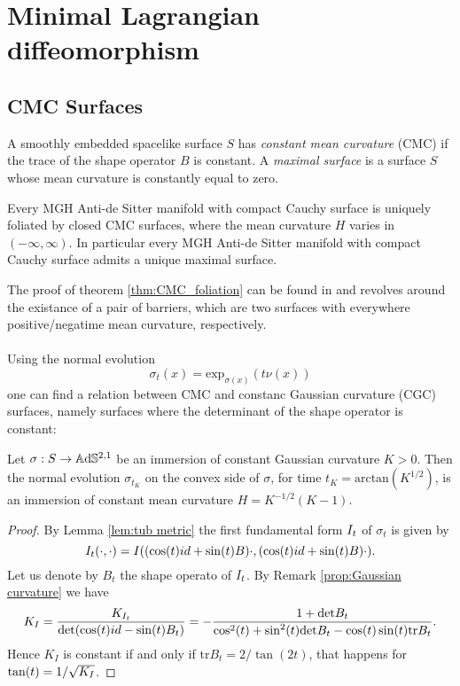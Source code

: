\chapter{Minimal Lagrangian diffeomorphism}



\section{CMC Surfaces}
A smoothly embedded spacelike surface $S$ has \textit{constant mean curvature} (CMC) if the trace of the shape operator $B$ is constant. A \textit{maximal surface} is a surface $S$ whose mean curvature is constantly equal to zero.
\begin{theorem}\label{thm:CMC_foliation}
    Every MGH Anti-de Sitter manifold with compact Cauchy surface is uniquely foliated by closed CMC surfaces, where the mean curvature $H$ varies in $(-\infty,\infty)$. In particular every MGH Anti-de Sitter manifold with compact Cauchy surface admits a unique maximal surface.
\end{theorem}
The proof of theorem \ref{thm:CMC_foliation} can be found in \cite{barbot2004constant} and revolves around the existance of a pair of barriers, which are two surfaces with everywhere positive/negatime mean curvature, respectively.\\
\\
Using the normal evolution
\[
    \sigma_t(x) = \text{exp}_{\sigma(x)} (t\nu(x))
\]
one can find a relation between CMC and constanc Gaussian curvature (CGC) surfaces, namely surfaces where the determinant of the shape operator is constant:
\begin{proposition} \label{prop:cmc to cgc}
    Let $\sigma: S \to\mathbb{A}\mathrm{d}\mathbb{S}^{2,1}$ be an immersion of constant Gaussian curvature $K>0$. Then the normal evolution $\sigma_{t_K}$ on the convex side of $\sigma$, for time $t_K=\text{arctan}(K^{1/2})$, is an immersion of constant mean curvature $H=K^{-1/2}(K-1)$.
\end{proposition}
\begin{proof}
    By Lemma \ref{lem:tub metric} the first fundamental form $I_t$ of $\sigma_t$ is given by
    \[
        I_t(\cdot, \cdot) = I((\cos(t)id + \sin(t)B)\cdot, (\cos(t)id + \sin(t)B)\cdot).
    \]
    Let us denote by $B_t$ the shape operato of $I_t$. By Remark \ref{prop:Gaussian curvature} we have
    \[
        K_I = \frac{K_{I_t}}{\text{det}(\cos(t)id - \sin(t)B_t)} = - \frac{1+\text{det}B_t}{\cos^2(t) + \sin^2(t)\text{det} B_t -\cos(t) \sin(t)\text{tr} B_t}.
    \]
    Hence $K_I$ is constant if and only if $\text{tr} B_t = 2/ \tan(2t)$, that happens for $\tan(t) = 1 / \sqrt{K_I}$.
\end{proof}

